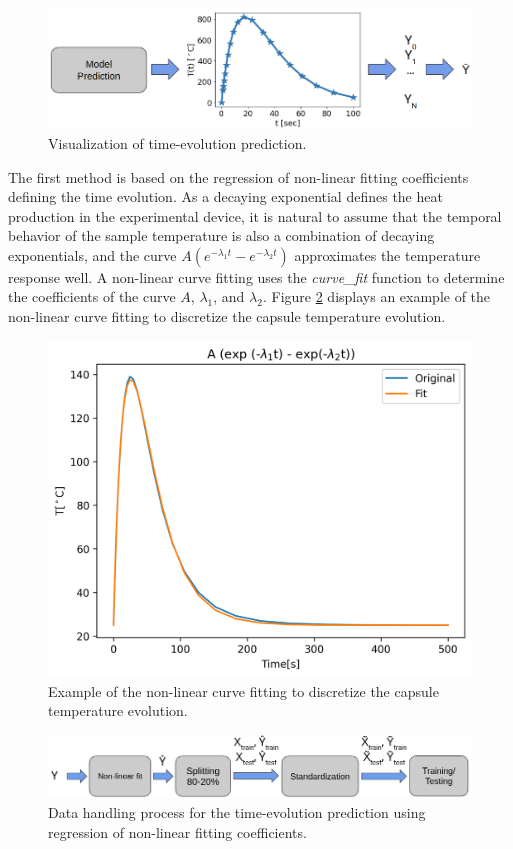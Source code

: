 \begin{figure}[htbp!] %
  \centering
  \includegraphics[width=0.7\linewidth]{figures/data-prediction-t}
  \caption{Visualization of time-evolution prediction.}
  \label{fig:data-class1}
\end{figure}

The first method is based on the regression of non-linear fitting coefficients defining the time evolution.
As a decaying exponential defines the heat production in the experimental device, it is natural to assume that the temporal behavior of the sample temperature is also a combination of decaying exponentials, and the curve $A (e^{-\lambda_1 t} - e^{-\lambda_2 t})$ approximates the temperature response well.
A non-linear curve fitting uses the \textit{curve\_fit} function \cite{2020SciPy-NMeth} to determine the coefficients of the curve $A$, $\lambda_1$, and $\lambda_2$.
Figure \ref{fig:nlin-fit} displays an example of the non-linear curve fitting to discretize the capsule temperature evolution.

\begin{figure}[htbp!] %
  \centering
  \includegraphics[width=0.50\linewidth]{figures/non-linear-fit}
  \caption{Example of the non-linear curve fitting to discretize the capsule temperature evolution.}
  \label{fig:nlin-fit}
\end{figure}

\begin{figure}[htbp!] %
  \centering
  \includegraphics[width=0.7\linewidth]{figures/data-pross-regression}
  \caption{Data handling process for the time-evolution prediction using regression of non-linear fitting coefficients.}
  \label{fig:data-reg}
\end{figure}

